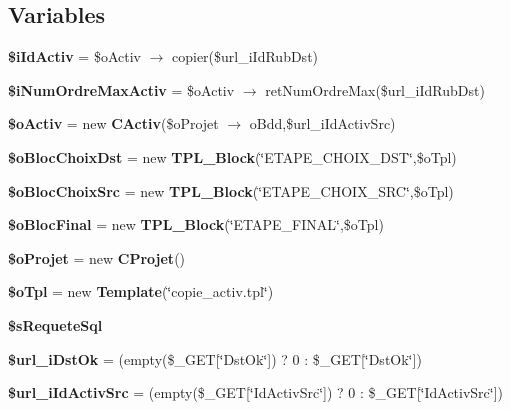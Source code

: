 \subsection*{Variables}
\begin{CompactItemize}
\item 
\textbf{\$iIdActiv} = \$oActiv $\rightarrow$ copier(\$url\_\-iIdRubDst)\label{copie__activ_8php_1c89ea8552400fc8ff829395372a1649}

\item 
\textbf{\$iNumOrdreMaxActiv} = \$oActiv $\rightarrow$ retNumOrdreMax(\$url\_\-iIdRubDst)\label{copie__activ_8php_87a3c1e7fce012306b370a44b9d72655}

\item 
\textbf{\$oActiv} = new {\bf CActiv}(\$oProjet $\rightarrow$ oBdd,\$url\_\-iIdActivSrc)\label{copie__activ_8php_413194d684278980b62458b17872c4df}

\item 
\textbf{\$oBlocChoixDst} = new {\bf TPL\_\-Block}(\char`\"{}ETAPE\_\-CHOIX\_\-DST\char`\"{},\$oTpl)\label{copie__activ_8php_a0f1cd44252709be7ca4d43a533220de}

\item 
\textbf{\$oBlocChoixSrc} = new {\bf TPL\_\-Block}(\char`\"{}ETAPE\_\-CHOIX\_\-SRC\char`\"{},\$oTpl)\label{copie__activ_8php_4cecff766c78bea7967c9c00a8fde40d}

\item 
\textbf{\$oBlocFinal} = new {\bf TPL\_\-Block}(\char`\"{}ETAPE\_\-FINAL\char`\"{},\$oTpl)\label{copie__activ_8php_0404b3d41507482ec262c7e0605fab5e}

\item 
\textbf{\$oProjet} = new {\bf CProjet}()\label{copie__activ_8php_ec412e7ac901485e72b77d2185159421}

\item 
\textbf{\$oTpl} = new {\bf Template}(\char`\"{}copie\_\-activ.tpl\char`\"{})\label{copie__activ_8php_7de57ba665b7c068e98ea46469be2865}

\item 
\textbf{\$sRequeteSql}
\item 
\textbf{\$url\_\-iDstOk} = (empty(\$\_\-GET[\char`\"{}DstOk\char`\"{}]) ? 0 : \$\_\-GET[\char`\"{}DstOk\char`\"{}])\label{copie__activ_8php_42d909467c92be850ded5265fb08476f}

\item 
\textbf{\$url\_\-iIdActivSrc} = (empty(\$\_\-GET[\char`\"{}IdActivSrc\char`\"{}]) ? 0 : \$\_\-GET[\char`\"{}IdActivSrc\char`\"{}])\label{copie__activ_8php_2476f217f96a9e2e79eceb4f136f2934}


\end{CompactItemize}
